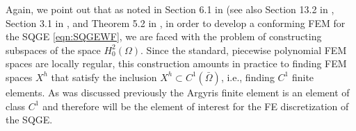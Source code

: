 Again, we point out that as noted in Section 6.1 in \cite{Ciarlet} (see also Section 13.2 in
\cite{Gunzburger89}, Section 3.1 in \cite{Johnson}, and Theorem 5.2 in \cite{Braess}, in order to
develop a conforming FEM for the SQGE \eqref{eqn:SQGEWF}, we are faced with the problem of
constructing subspaces of the space $H^2_0(\Omega)$. Since the standard, piecewise polynomial FEM
spaces are locally regular, this construction amounts in practice to finding FEM spaces $X^h$ that
satisfy the inclusion $X^h \subset C^1({\bar \Omega})$, i.e., finding $C^1$ finite elements. As was
discussed previously the Argyris finite element is an element of class $C^1$ and therefore will be
the element of interest for the FE discretization of the SQGE. 

